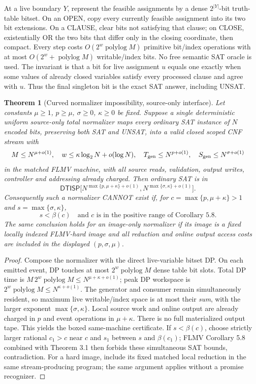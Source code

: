 \documentclass[11pt]{article}
\newtheorem{theorem}{Theorem}
\newcommand{\DTISP}{\mathsf{DTISP}}
\begin{document}
At a live boundary $Y$, represent the feasible assignments by a dense
$2^{|Y|}$-bit truth-table bitset. On an OPEN, copy every currently feasible
assignment into its two bit extensions. On a CLAUSE, clear bits not satisfying
that clause; on CLOSE, existentially OR the two bits that differ only in the
closing coordinate, then compact. Every step costs $O(2^w\operatorname{polylog}M)$
primitive bit/index operations with at most $O(2^w+\operatorname{polylog}M)$
writable/index bits. No free semantic SAT oracle is used. The invariant is
that a bit for live assignment $u$ equals one exactly when some values of
already closed variables satisfy every processed clause and agree with $u$.
Thus the final singleton bit is the exact SAT answer, including UNSAT.

\begin{theorem}[Curved normalizer impossibility, source-only interface]\label{thm:frontier}
Let constants $\mu\ge1$, $p\ge\mu$, $\sigma\ge0$, $\kappa\ge0$ be fixed.
Suppose a single deterministic uniform \emph{source-only} total normalizer
maps \emph{every ordinary SAT instance} of $N$ encoded bits, preserving both
SAT and UNSAT, into a valid closed scoped CNF stream with
\[
M\le N^{\mu+o(1)},\quad
w\le\kappa\log_2N+o(\log N),\quad
T_{\rm gen}\le N^{p+o(1)},\quad
S_{\rm gen}\le N^{\sigma+o(1)}
\]
in the matched FLMV machine, with all source reads, validation, output writes,
controller and addressing already charged. Then ordinary SAT is in
\[
\boxed{\DTISP\bigl[N^{\max\{p,\mu+\kappa\}+o(1)},
N^{\max\{\sigma,\kappa\}+o(1)}\bigr].}
\]
Consequently such a normalizer CANNOT exist if, for
$c=\max\{p,\mu+\kappa\}>1$ and $s=\max\{\sigma,\kappa\}$,
\[
\boxed{s<\beta(c)\quad\text{and }c\text{ is in the positive range of Corollary 5.8}.}
\]
The same conclusion holds for an image-only normalizer if its image is a
\emph{fixed locally indexed FLMV-hard image} and all reduction and online
output access costs are included in the displayed $(p,\sigma,\mu)$.
\end{theorem}
\begin{proof}
Compose the normalizer with the direct live-variable bitset DP. On each
emitted event, DP touches at most $2^w\operatorname{polylog}M$ dense table
bit slots. Total DP time is
$M\,2^w\operatorname{polylog}M\le N^{\mu+\kappa+o(1)}$;
peak DP workspace is $2^w\operatorname{polylog}M\le N^{\kappa+o(1)}$.
The generator and consumer remain simultaneously resident, so maximum live
writable/index space is at most their \emph{sum}, with the larger exponent
$\max\{\sigma,\kappa\}$. Local source work and online output are already
charged in $p$ and event operations in $\mu+\kappa$. There is no full
materialized output tape. This yields the boxed same-machine certificate.
If $s<\beta(c)$, choose strictly larger rational $c_1>c$ near $c$ and
$s_1$ between $s$ and $\beta(c_1)$; FLMV Corollary 5.8 combined with
Theorem 3.1 then forbids these simultaneous SAT bounds, contradiction.
For a hard image, include its fixed matched local reduction in the same
stream-producing program; the same argument applies without a promise
recognizer. \end{proof}
\end{document}
